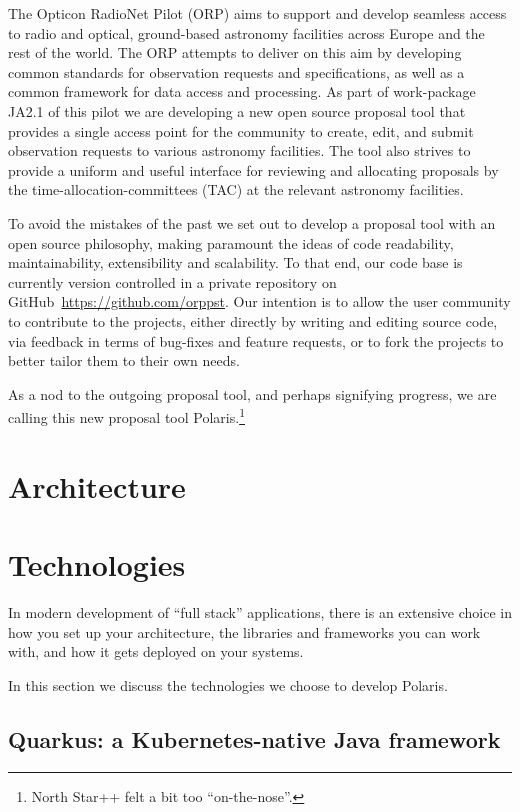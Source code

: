 \documentclass[11pt,twoside]{article}
\begin{document}
The Opticon RadioNet Pilot (ORP) aims to support and develop seamless access to radio and optical, ground-based
astronomy facilities across Europe and the rest of the world.
The ORP attempts to deliver on this aim by developing common standards for observation requests and specifications,
as well as a common framework for data access and processing.
As part of work-package JA2.1 of this pilot we are developing a new open source proposal tool that provides a single
access point for the community to create, edit, and submit observation requests to various astronomy facilities.
The tool also strives to provide a uniform and useful interface for reviewing and allocating proposals by the
time-allocation-committees (TAC) at the relevant astronomy facilities.

To avoid the mistakes of the past we set out to develop a proposal tool with an open source philosophy, making
paramount the ideas of code readability, maintainability, extensibility and scalability.
To that end, our code base is currently version controlled in a private repository on
GitHub~\url{https://github.com/orppst}.
Our intention is to allow the user community to contribute to the projects, either directly by writing and editing
source code, via feedback in terms of bug-fixes and feature requests, or to fork the projects to better tailor
them to their own needs.

As a nod to the outgoing proposal tool, and perhaps signifying progress, we are calling this new proposal tool
Polaris.\footnote{North Star++ felt a bit too ``on-the-nose''.}

\section{Architecture}\label{sec:architecture}


\section{Technologies}\label{sec:technologies}

In modern development of ``full stack'' applications, there is an extensive choice in how you set up your
architecture, the libraries and frameworks you can work with, and how it gets deployed on your systems.

In this section we discuss the technologies we choose to develop Polaris.

\subsection{Quarkus: a Kubernetes-native Java framework}\label{subsec:quarkus}
\end{document}

